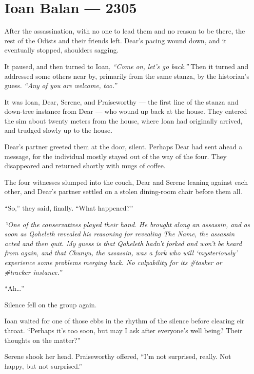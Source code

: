 \hypertarget{ioan-balan-2305}{%
\chapter*{Ioan Balan — 2305}\label{ioan-balan-2305}}

After the assassination, with no one to lead them and no reason to be there, the rest of the Odists and their friends left. Dear's pacing wound down, and it eventually stopped, shoulders sagging.

It paused, and then turned to Ioan, \emph{``Come on, let's go back.''} Then it turned and addressed some others near by, primarily from the same stanza, by the historian's guess. \emph{``Any of you are welcome, too.''}

It was Ioan, Dear, Serene, and Praiseworthy — the first line of the stanza and down-tree instance from Dear — who wound up back at the house. They entered the sim about twenty meters from the house, where Ioan had originally arrived, and trudged slowly up to the house.

Dear's partner greeted them at the door, silent. Perhaps Dear had sent ahead a message, for the individual mostly stayed out of the way of the four. They disappeared and returned shortly with mugs of coffee.

The four witnesses slumped into the couch, Dear and Serene leaning against each other, and Dear's partner settled on a stolen dining-room chair before them all.

``So,'' they said, finally. ``What happened?''

\emph{``One of the conservatives played their hand. He brought along an assassin, and as soon as Qoheleth revealed his reasoning for revealing The Name, the assassin acted and then quit. My guess is that Qoheleth hadn't forked and won't be heard from again, and that Chunyu, the assassin, was a fork who will `mysteriously' experience some problems merging back. No culpability for its \#tasker or \#tracker instance.''}

``Ah\ldots{}''

Silence fell on the group again.

Ioan waited for one of those ebbs in the rhythm of the silence before clearing eir throat. ``Perhaps it's too soon, but may I ask after everyone's well being? Their thoughts on the matter?''

Serene shook her head. Praiseworthy offered, ``I'm not surprised, really. Not happy, but not surprised.''


